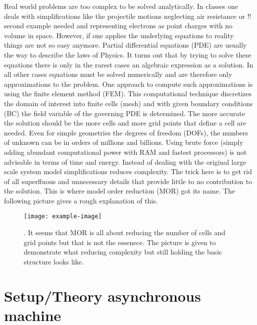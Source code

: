 \documentclass{scrartcl}
\begin{document}
Real world problems are too complex to be solved analytically. In classes one deals with simplifications like the projectile motions neglecting air resistance or \alert{!! second example needed} and representing electrons as point charges with no volume in space. However, if one applies the underlying equations to reality things are not so easy anymore. Partial differential equations (PDE) are usually the way to describe the laws of Physics. It turns out that by trying to solve these equations there is only in the rarest cases an algebraic expression as a solution. In all other cases equations must be solved numerically and are therefore only approximations to the problem. One approach to compute such approximations is using the finite element method (FEM). This computational technique discretizes the domain of interest into finite cells (mesh) and with given boundary conditions (BC) the field variable of the governing PDE is determined. The more accurate the solution should be the more cells and more grid points that define a cell are needed. Even for simple geometries the degrees of freedom (DOFs), \ie{} the numbers of unknown can be in orders of millions and billions. Using brute force (simply adding abundant computational power with RAM and fastest processors) is not advisable in terms of time and energy. Instead of dealing with the original large scale system model simplifications reduces complexity. The trick here is to get rid of all superfluous and unnecessary details that provide little to no contribution to the solution. This is where model order reduction (MOR) got its name. The following picture gives a rough explanation of this.
\begin{figure}[H]
	\texttt{[image: example-image]}
	\caption{\cite[2]{benner2021model}. It seems that MOR is all about reducing the number of cells and grid points but that is not the essenece. The picture is given to demonstrate what reducing complexity but still holding the basic structure looks like.}
	\label{}
\end{figure}


\section{Setup/Theory asynchronous machine}
\cite[p722]{sahdev2017electrical}
\cite[p263]{wildi2006electrical}
\end{document}
